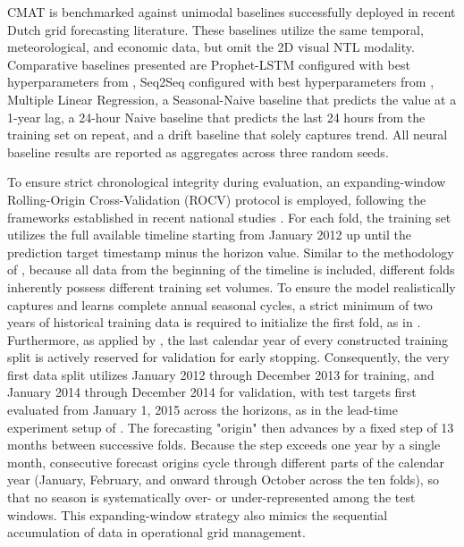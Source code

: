 CMAT is benchmarked against unimodal baselines successfully deployed in recent Dutch grid forecasting literature. These baselines utilize the same temporal, meteorological, and economic data, but omit the 2D visual NTL modality. Comparative baselines presented are Prophet-LSTM configured with best hyperparameters from \cite{van_de_sande_enhancing_2024}, Seq2Seq configured with best hyperparameters from \cite{ashtar_hybrid_2025}, Multiple Linear Regression, a Seasonal-Naive baseline that predicts the value at a 1-year lag, a 24-hour Naive baseline that predicts the last 24 hours from the training set on repeat, and a drift baseline that solely captures trend. All neural baseline results are reported as aggregates across three random seeds.

To ensure strict chronological integrity during evaluation, an expanding-window Rolling-Origin Cross-Validation (ROCV) protocol is employed, following the frameworks established in recent national studies \cite{van_de_sande_enhancing_2024, curiel_integrating_2025}. For each fold, the training set utilizes the full available timeline starting from January 2012 up until the prediction target timestamp minus the horizon value. Similar to the methodology of \cite{curiel_integrating_2025,van_de_sande_enhancing_2024}, because all data from the beginning of the timeline is included, different folds inherently possess different training set volumes. To ensure the model realistically captures and learns complete annual seasonal cycles, a strict minimum of two years of historical training data is required to initialize the first fold, as in \cite{van_de_sande_enhancing_2024}. Furthermore, as applied by \cite{curiel_integrating_2025}, the last calendar year of every constructed training split is actively reserved for validation for early stopping. Consequently, the very first data split utilizes January 2012 through December 2013 for training, and January 2014 through December 2014 for validation, with test targets first evaluated from January 1, 2015 across the horizons, as in the lead-time experiment setup of \cite{van_de_sande_enhancing_2024}. The forecasting "origin" then advances by a fixed step of 13 months between successive folds. Because the step exceeds one year by a single month, consecutive forecast origins cycle through different parts of the calendar year (January, February, and onward through October across the ten folds), so that no season is systematically over- or under-represented among the test windows. This expanding-window strategy also mimics the sequential accumulation of data in operational grid management.

